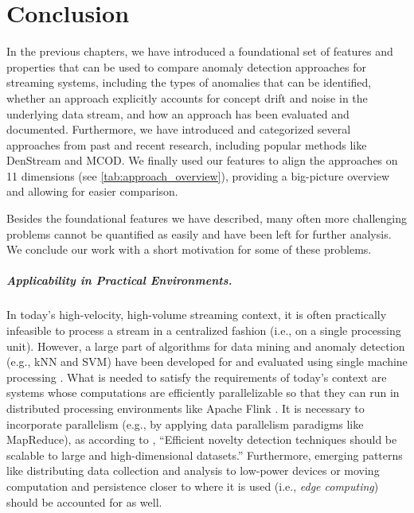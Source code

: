 \chapter{Conclusion}
\label{c:conclusion}

In the previous chapters, we have introduced a foundational set of features and properties that can be used to compare anomaly detection approaches for streaming systems, including the types of anomalies that can be identified, whether an approach explicitly accounts for concept drift and noise in the underlying data stream, and how an approach has been evaluated and documented. Furthermore, we have introduced and categorized several approaches from past and recent research, including popular methods like DenStream and MCOD. We finally used our features to align the approaches on 11 dimensions (see \cref{tab:approach_overview}), providing a big-picture overview and allowing for easier comparison.

Besides the foundational features we have described, many often more challenging problems cannot be quantified as easily and have been left for further analysis. We conclude our work with a short motivation for some of these problems.

\paragraph{Applicability in Practical Environments.}
In today's high-velocity, high-volume streaming context, it is often practically infeasible to process a stream in a centralized fashion (i.e., on a single processing unit). However, a large part of algorithms for data mining and anomaly detection (e.g., kNN and SVM) have been developed for and evaluated using single machine processing \citep{hayes_contextual_2015}. What is needed to satisfy the requirements of today’s context are systems whose computations are efficiently parallelizable so that they can run in distributed processing environments like Apache Flink \citep{toliopoulos_continuous_2019}. It is necessary to incorporate parallelism (e.g., by applying data parallelism paradigms like MapReduce), as according to \citet{pimentel_review_2014}, ``Efficient novelty detection techniques should be scalable to large and high-dimensional datasets.'' Furthermore, emerging patterns like distributing data collection and analysis to low-power devices or moving computation and persistence closer to where it is used (i.e., \emph{edge computing}) should be accounted for as well.

